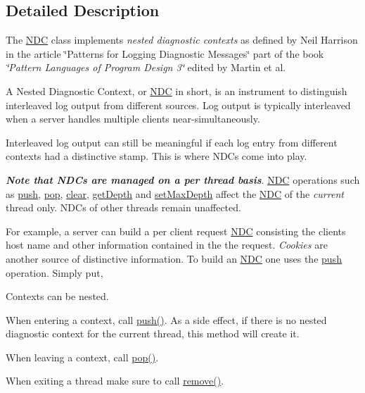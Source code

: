 

\subsection{Detailed Description}
The \hyperlink{classlog4cplus_1_1NDC}{N\-D\-C} class implements {\itshape nested diagnostic contexts} as defined by Neil Harrison in the article \char`\"{}\-Patterns for Logging
\-Diagnostic Messages\char`\"{} part of the book {\itshape \char`\"{}\-Pattern Languages of
\-Program Design 3\char`\"{}} edited by Martin et al.

A Nested Diagnostic Context, or \hyperlink{classlog4cplus_1_1NDC}{N\-D\-C} in short, is an instrument to distinguish interleaved log output from different sources. Log output is typically interleaved when a server handles multiple clients near-\/simultaneously.

Interleaved log output can still be meaningful if each log entry from different contexts had a distinctive stamp. This is where N\-D\-Cs come into play.

{\itshape {\bfseries Note that N\-D\-Cs are managed on a per thread basis}}. \hyperlink{classlog4cplus_1_1NDC}{N\-D\-C} operations such as \hyperlink{classlog4cplus_1_1NDC_a5ce2b0d8e4c225613fdd8a642a01c992}{push}, \hyperlink{classlog4cplus_1_1NDC_a3f446e2479800b222b31cf7e30628c41}{pop}, \hyperlink{classlog4cplus_1_1NDC_a822956761c830e6b9c37795fc0252211}{clear}, \hyperlink{classlog4cplus_1_1NDC_a87b46fd51e682014337868fa7a8d9257}{get\-Depth} and \hyperlink{classlog4cplus_1_1NDC_af905c21dfc8a4aedb0ac46a6a66936ff}{set\-Max\-Depth} affect the \hyperlink{classlog4cplus_1_1NDC}{N\-D\-C} of the {\itshape current} thread only. N\-D\-Cs of other threads remain unaffected.

For example, a server can build a per client request \hyperlink{classlog4cplus_1_1NDC}{N\-D\-C} consisting the clients host name and other information contained in the the request. {\itshape Cookies} are another source of distinctive information. To build an \hyperlink{classlog4cplus_1_1NDC}{N\-D\-C} one uses the \hyperlink{classlog4cplus_1_1NDC_a5ce2b0d8e4c225613fdd8a642a01c992}{push} operation. Simply put,


\begin{DoxyItemize}
\item Contexts can be nested.
\item When entering a context, call {\ttfamily \hyperlink{classlog4cplus_1_1NDC_a5ce2b0d8e4c225613fdd8a642a01c992}{push()}}. As a side effect, if there is no nested diagnostic context for the current thread, this method will create it.
\item When leaving a context, call {\ttfamily \hyperlink{classlog4cplus_1_1NDC_a3f446e2479800b222b31cf7e30628c41}{pop()}}.
\item When exiting a thread make sure to call {\ttfamily \hyperlink{classlog4cplus_1_1NDC_a43f2d8571dc52f6dc2bd737bb3f88099}{remove()}}.
\end{DoxyItemize}

